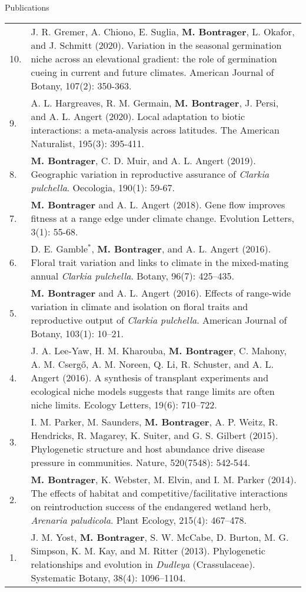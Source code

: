 \documentclass[letterpaper,11pt,oneside]{article}
\begin{document}
\bigskip
\bigskip




\noindent\Large{Publications}  
\normalsize
\bigskip

\def\arraystretch{1.2}
\noindent \begin{tabular}{@{} p{1cm} >{\raggedright\arraybackslash}p{15.11cm}}
10. & J. R. Gremer, A. Chiono, E. Suglia, \textbf{M. Bontrager}, L. Okafor, and J. Schmitt (2020). Variation in the seasonal germination niche across an elevational gradient: the role of germination cueing in current and future climates. American Journal of Botany, 107(2): 350-363. \\
9. & A. L. Hargreaves, R. M. Germain, \textbf{M. Bontrager}, J. Persi, and A. L. Angert (2020). Local adaptation to biotic interactions: a meta-analysis across latitudes. The American Naturalist, 195(3): 395-411. \\
8. & \textbf{M. Bontrager}, C. D. Muir, and A. L. Angert (2019). Geographic variation in reproductive assurance of \textit{Clarkia pulchella}. Oecologia, 190(1): 59-67. \\
7. & \textbf{M. Bontrager} and A. L. Angert (2018). Gene flow improves fitness at a range edge under climate change. Evolution Letters, 3(1): 55-68. \\
6. & D. E. Gamble$^{*}$, \textbf{M. Bontrager}, and A. L. Angert (2016). Floral trait variation and links to climate in the mixed-mating annual \textit{Clarkia pulchella}. Botany, 96(7): 425–435. \\
5. & \textbf{M. Bontrager} and A. L. Angert (2016). Effects of range-wide variation in climate and isolation on floral traits and reproductive output of \textit{Clarkia pulchella}. American Journal of Botany, 103(1): 10–21.  \\
4. & J. A. Lee-Yaw, H. M. Kharouba, \textbf{M. Bontrager}, C. Mahony, A. M. Cserg{\H{o}}, A. M. Noreen, Q. Li, R. Schuster, and A. L. Angert (2016). A synthesis of transplant experiments and ecological niche models suggests that range limits are often niche limits. Ecology Letters, 19(6): 710–722. \\
3. & I. M. Parker, M. Saunders, \textbf{M. Bontrager}, A. P. Weitz, R. Hendricks, R. Magarey, K. Suiter, and G. S. Gilbert (2015). Phylogenetic structure and host abundance drive disease pressure in communities. Nature, 520(7548): 542-544. \\
2. & \textbf{M. Bontrager}, K. Webster, M. Elvin, and I. M. Parker (2014). The effects of habitat and competitive/facilitative interactions on reintroduction success of the endangered wetland herb, \textit{Arenaria paludicola}. Plant Ecology, 215(4): 467–478. \\
1. & J. M. Yost, \textbf{M. Bontrager}, S. W. McCabe, D. Burton, M. G. Simpson, K. M. Kay, and M. Ritter (2013). Phylogenetic relationships and evolution in \textit{Dudleya} (Crassulaceae). Systematic Botany, 38(4): 1096–1104. \\
\end{tabular}
\end{document}
